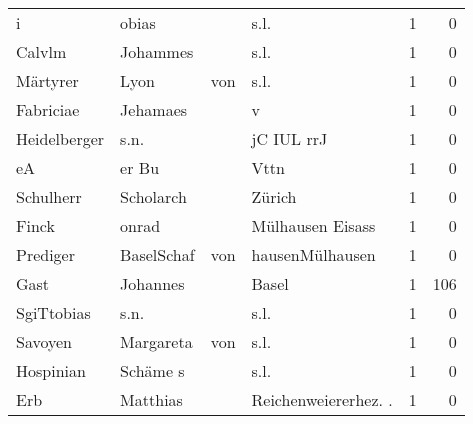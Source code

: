 \begin{center}
\begin{tiny}
\begin{longtabu}{llllrr}
                        i &                              obias &             &                                        s.l. &          1 &         0 \\
                   Calvlm &                           Johammes &             &                                        s.l. &          1 &         0 \\
                 Märtyrer &                               Lyon &         von &                                        s.l. &          1 &         0 \\
                Fabriciae &                           Jehamaes &             &                                           v &          1 &         0 \\
             Heidelberger &                               s.n. &             &                                  jC IUL rrJ &          1 &         0 \\
                       eA &                              er Bu &             &                                        Vttn &          1 &         0 \\
                Schulherr &                          Scholarch &             &                                      Zürich &          1 &         0 \\
                    Finck &                              onrad &             &                            Mülhausen Eisass &          1 &         0 \\
                 Prediger &                         BaselSchaf &         von &                             hausenMülhausen &          1 &         0 \\
                     Gast &                           Johannes &             &                                       Basel &          1 &       106 \\
               SgiTtobias &                               s.n. &             &                                        s.l. &          1 &         0 \\
                  Savoyen &                          Margareta &         von &                                        s.l. &          1 &         0 \\
                Hospinian &                           Schäme s &             &                                        s.l. &          1 &         0 \\
                      Erb &                           Matthias &             &                       Reichenweiererhez. .  &          1 &         0 \\

\end{longtabu}
\end{tiny}
\end{center}

